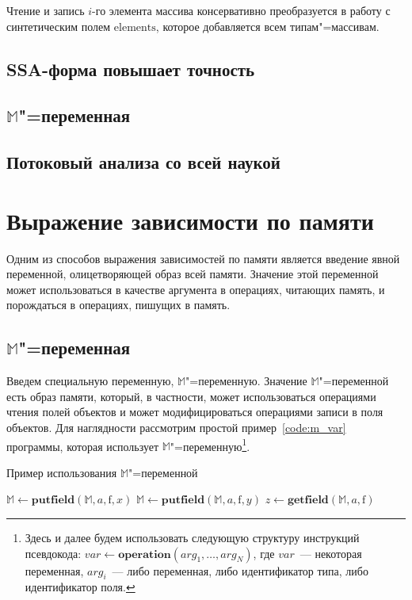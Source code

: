 \documentclass[14pt,titlepage,draft]{extarticle}
\newcommand{\M}{\ensuremath{\mathbb{M}}}
\newcommand{\field}[1]{\mathrm{#1}}
\newcommand{\op}[1]{\mathbf{#1}}
\begin{document}
    Чтение и запись $i$-го элемента массива консервативно преобразуется в
    работу с синтетическим полем $\field{elements}$, которое добавляется всем
    типам"=массивам.

  \subsection{SSA-форма повышает точность}

  \subsection{\texorpdfstring{\M}{M}"=переменная}

  \subsection{Потоковый анализа со всей наукой}


  \section{Выражение зависимости по памяти}
    \label{section:m_variable}

    Одним из способов выражения зависимостей по памяти является введение
    явной переменной, олицетворяющей образ всей памяти. Значение этой
    переменной может использоваться в качестве аргумента в операциях, читающих
    память, и порождаться в операциях, пишущих в память.

  \subsection{\texorpdfstring{\M}{M}"=переменная}

    Введем специальную переменную, \M"=переменную. Значение \M"=переменной
    есть образ памяти, который, в частности, может использоваться операциями
    чтения полей объектов и может модифицироваться операциями записи в поля
    объектов. Для наглядности рассмотрим простой пример~\ref{code:m_var}
    программы, которая использует \M"=переменную\footnote{
      Здесь и далее будем использовать следующую структуру инструкций
      псевдокода: $var \gets \op{operation}(arg_1, \ldots, arg_N)$, где
      $var$~--- некоторая переменная, $arg_i$~--- либо переменная, либо
      идентификатор типа, либо идентификатор поля.}.

    \begin{algorithm}
      \caption{Пример использования \M"=переменной}
      \label{code:m_var}
      \begin{algorithmic}[1]
        \If{\ldots}
          \State $\M \gets \op{putfield}(\M, a, \field{f}, x)$
        \Else
          \State $\M \gets \op{putfield}(\M, a, \field{f}, y)$
        \EndIf
        \State $z \gets \op{getfield}(\M, a, \field{f})$
      \end{algorithmic}
    \end{algorithm}
\end{document}
